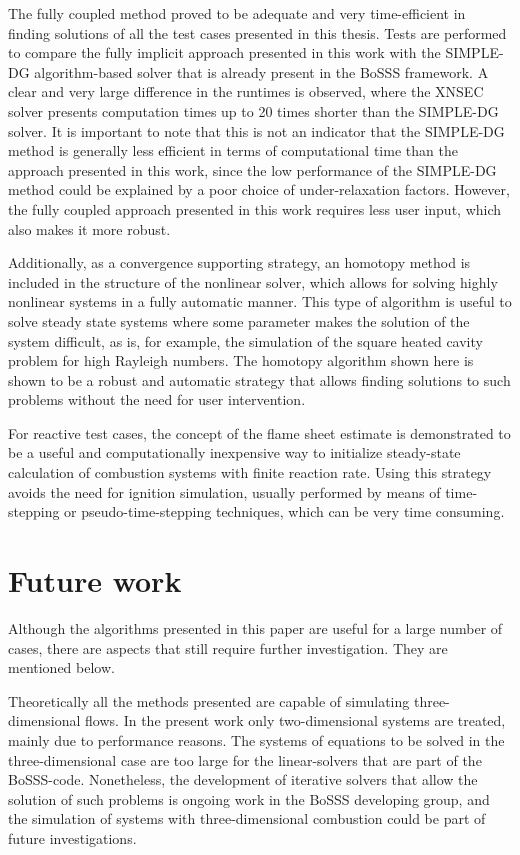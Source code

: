 The fully coupled method proved to be adequate and very time-efficient in finding solutions of all the test cases presented in this thesis. Tests are performed to compare the fully implicit approach presented in this work with the SIMPLE-DG algorithm-based solver that is already present in the BoSSS framework. A clear and very large difference in the runtimes is observed, where the XNSEC solver presents computation times up to 20 times shorter than the SIMPLE-DG solver. It is important to note that this is not an indicator that the SIMPLE-DG method is generally less efficient in terms of computational time than the approach presented in this work, since the low performance of the SIMPLE-DG method could be explained by a poor choice of under-relaxation factors. However, the fully coupled approach presented in this work requires less user input, which also makes it more robust.

Additionally, as a convergence supporting strategy, an homotopy method is included in the structure of the nonlinear solver, which allows for solving highly nonlinear systems in a fully automatic manner. This type of algorithm is useful to solve steady state systems where some parameter makes the solution of the system difficult, as is, for example, the simulation of the square heated cavity problem for high Rayleigh numbers. The homotopy algorithm shown here is shown to be a robust and automatic strategy that allows finding solutions to such problems without the need for user intervention.

For reactive test cases, the concept of the flame sheet estimate is demonstrated to be a useful and computationally inexpensive way to initialize steady-state calculation of combustion systems with finite reaction rate. Using this strategy avoids the need for ignition simulation, usually performed by means of time-stepping or pseudo-time-stepping techniques, which can be very time consuming.

\section{Future work}

Although the algorithms presented in this paper are useful for a large number of cases, there are aspects that still require further investigation. They are mentioned below.

Theoretically all the methods presented are capable of simulating three-dimensional flows. In the present work only two-dimensional systems are treated, mainly due to performance reasons. The systems of equations to be solved in the three-dimensional case are too large for the linear-solvers that are part of the BoSSS-code. Nonetheless, the development of iterative solvers that allow the solution of such problems is ongoing work in the BoSSS developing group, and the simulation of systems with three-dimensional combustion could be part of future investigations.

